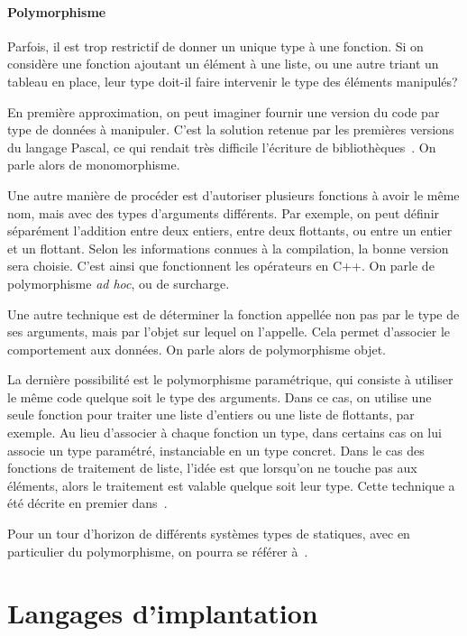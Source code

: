 \paragraph{Polymorphisme}

Parfois, il est trop restrictif de donner un unique type à une fonction. Si on
considère une fonction ajoutant un élément à une liste, ou une autre
triant un tableau en place, leur type doit-il faire intervenir le type des
éléments manipulés?

En première approximation, on peut imaginer fournir une version du code par type
de données à manipuler. C'est la solution retenue par les premières versions du
langage Pascal, ce qui rendait très difficile l'écriture de
bibliothèques~\cite{PascalNoEscape}. On parle alors de monomorphisme.

Une autre manière de procéder est d'autoriser plusieurs fonctions à avoir le
même nom, mais avec des types d'arguments différents. Par exemple, on peut
définir séparément l'addition entre deux entiers, entre deux flottants, ou entre
un entier et un flottant. Selon les informations connues à la compilation, la
bonne version sera choisie. C'est ainsi que fonctionnent les opérateurs en C++.
On parle de polymorphisme \emph{ad hoc}, ou de surcharge.

Une autre technique est de déterminer la fonction appellée non pas par le type
de ses arguments, mais par l'objet sur lequel on l'appelle. Cela permet
d'associer le comportement aux données. On parle alors de polymorphisme objet.


La dernière possibilité est le polymorphisme paramétrique, qui consiste à
utiliser le \linebreak même code quelque soit le type des arguments. Dans ce
cas, on utilise une seule fonction pour traiter une liste d'entiers ou une liste
de flottants, par exemple. Au lieu d'associer à chaque fonction un type, dans
certains cas on lui associe un type paramétré, instanciable en un type concret.
Dans le cas des fonctions de traitement de liste, l'idée est que lorsqu'on ne
touche pas aux éléments, alors le traitement est valable quelque soit leur type.
Cette technique a été décrite en premier dans~\cite{Milner78}.

Pour un tour d'horizon de différents systèmes types de statiques, avec en
particulier du polymorphisme, on pourra se référer à~\cite{TAPL}.

\section{Langages d'implantation}

